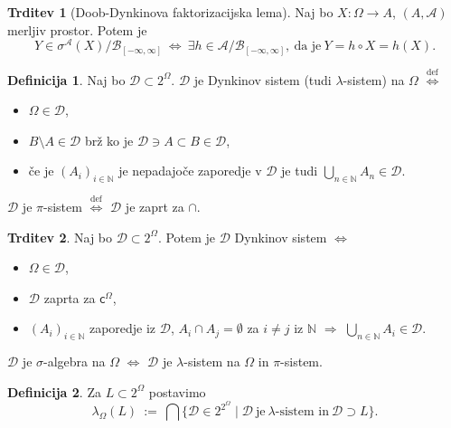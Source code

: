 \documentclass[11pt]{article}
\newcommand{\N}{\mathbb{N}}
\newcommand{\A}{\mathcal{A}}
\newcommand{\D}{\mathcal{D}}
\renewcommand{\L}{L}
\newcommand{\B}{\mathscr{B}}
\renewcommand{\c}{\mathsf{c}}
\newcommand{\diff}{\overset{\text{def}}{\iff}}
\newcommand{\set}[1]{\{#1\}}
\newcommand{\1}{\mathbbm{1}}
\newcommand{\rr}{[-\infty,\infty]}
\theoremstyle{definition}
\newtheorem{definicija}{Definicija}[section]
\theoremstyle{definition}
\newtheorem{trditev}{Trditev}[section]
\theoremstyle{definition}
\theoremstyle{definition}
\begin{document}
\begin{trditev}[Doob-Dynkinova faktorizacijska lema]

Naj bo $X: \Omega \rightarrow A$, $(A, \A)$ merljiv prostor. Potem je
$$Y \in \sigma^\A(X)/\B_{\rr} ~\iff~ \exists h \in \A/\B_{\rr}, ~\text{da je}~ Y = h \circ X = h(X).$$

\end{trditev}
\vspace{0.5cm}

\begin{definicija}

Naj bo $\D \subset 2^\Omega$. $\D$ je Dynkinov sistem (tudi $\lambda$-sistem) na $\Omega$ $\diff$
\begin{itemize}
	\item $\Omega \in \D$,
	\item $B\setminus A \in \D $ brž ko je $ \D \ni A \subset B \in \D$,
	\item če je $(A_i)_{i \in \N}$ je nepadajoče zaporedje v $\D$ je tudi $\bigcup_{n \in \N} A_n \in \D$.
\end{itemize}
$\D$ je $\pi$-sistem $\diff$ $\D$ je zaprt za $\cap$.

\end{definicija}
\vspace{0.5cm}

\begin{trditev}

Naj bo $\D \subset 2^\Omega$. Potem je $\D$ Dynkinov sistem $\iff$
\begin{itemize}
	\item $\Omega \in \D$,
	\item $\D$ zaprta za $\c^\Omega$,
	\item $(A_i)_{i \in \N}$ zaporedje iz $\D$, $A_i \cap A_j = \emptyset$ za $i \neq j$ iz $\N$ $\Longrightarrow$ $\bigcup_{n \in \N} A_i \in \D$.
\end{itemize}
$\D$ je $\sigma$-algebra na $\Omega$ $\iff$ $\D$ je $\lambda$-sistem na $\Omega$ in $\pi$-sistem.

\end{trditev}
\vspace{0.5cm}

\begin{definicija}

Za $\L \subset 2^\Omega$ postavimo
$$\lambda_\Omega(\L) ~:=~ \bigcap\set{\D \in 2^{2^\Omega} \mid \D ~\text{je}~\lambda\text{-sistem in}~\D\supset\L}.$$

\end{definicija}
\vspace{0.5cm}
\end{document}
